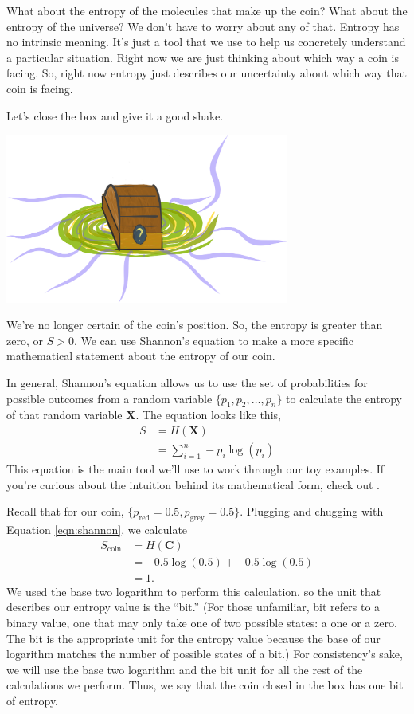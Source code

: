 What about the entropy of the molecules that make up the coin?
What about the entropy of the universe?
We don't have to worry about any of that.
Entropy has no intrinsic meaning.
It's just a tool that we use to help us concretely understand a particular situation.
Right now we are just thinking about which way a coin is facing.
So, right now entropy just describes our uncertainty about which way that coin is facing.

Let's close the box and give it a good shake.
\begin{center}
\includegraphics[width=0.7\textwidth]{img/big-box-closed-portal}
\end{center}
We're no longer certain of the coin's position.
So, the entropy is greater than zero, or $S > 0$.
We can use Shannon's equation to make a more specific mathematical statement about the entropy of our coin.

In general, Shannon's equation allows us to use the set of probabilities for possible outcomes from a random variable $\{p_1, p_2, \ldots, p_n\}$ to calculate the entropy of that random variable $\bm{X}$.
The equation looks like this,
\begin{align} \label{eqn:shannon}
S
&= H(\bm{X}) \\
&= \sum_{i=1}^{n} -p_i \log(p_i)
\end{align}
This equation is the main tool we'll use to work through our toy examples.
If you're curious about the intuition behind its mathematical form, check out \cite{Adami2016}.

Recall that for our coin, $\{p_{\text{red}} = 0.5, p_{\text{grey}} = 0.5 \}$.
Plugging and chugging with Equation \ref{eqn:shannon}, we calculate
\begin{align*}
S_{\text{coin}}
&= H(\bm{C}) \\
&= -0.5 \log(0.5) + -0.5 \log(0.5) \\
&= 1.
\end{align*}
We used the base two logarithm to perform this calculation, so the unit that describes our entropy value is the ``bit.''
(For those unfamiliar, bit refers to a binary value, one that may only take one of two possible states: a one or a zero.
The bit is the appropriate unit for the entropy value because the base of our logarithm matches the number of possible states of a bit.)
For consistency's sake, we will use the base two logarithm and the bit unit for all the rest of the calculations we perform.
Thus, we say that the coin closed in the box has one bit of entropy.

